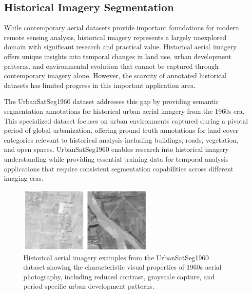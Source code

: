 \subsection{Historical Imagery Segmentation}

While contemporary aerial datasets provide important foundations for modern remote sensing analysis, historical imagery represents a largely unexplored domain with significant research and practical value. Historical aerial imagery offers unique insights into temporal changes in land use, urban development patterns, and environmental evolution that cannot be captured through contemporary imagery alone. However, the scarcity of annotated historical datasets has limited progress in this important application area.

The UrbanSatSeg1960 dataset addresses this gap by providing semantic segmentation annotations for historical urban aerial imagery from the 1960s era. This specialized dataset focuses on urban environments captured during a pivotal period of global urbanization, offering ground truth annotations for land cover categories relevant to historical analysis including buildings, roads, vegetation, and open spaces. UrbanSatSeg1960 enables research into historical imagery understanding while providing essential training data for temporal analysis applications that require consistent segmentation capabilities across different imaging eras.

\begin{figure}[htbp]
\centering
\includegraphics[width=0.6\textwidth]{Images/1960.png}
\caption{Historical aerial imagery examples from the UrbanSatSeg1960 dataset showing the characteristic visual properties of 1960s aerial photography, including reduced contrast, grayscale capture, and period-specific urban development patterns.}
\label{fig:historical_examples}
\end{figure}

